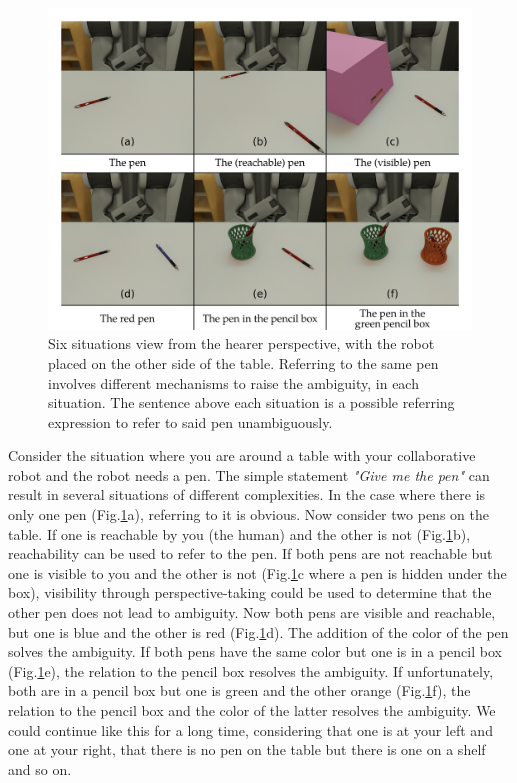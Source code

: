 \begin{figure}[h!]
\centering
\includegraphics[scale=0.16]{figures/chapter4/intro.png}
\caption{\label{fig:chap4_intro} Six situations view from the hearer perspective, with the robot placed on the other side of the table. Referring to the same pen involves different mechanisms to raise the ambiguity, in each situation. The sentence above each situation is a possible referring expression to refer to said pen unambiguously. }
\end{figure}

Consider the situation where you are around a table with your collaborative robot and the robot needs a pen. The simple statement \textit{"Give me the pen"} can result in several situations of different complexities. In the case where there is only one pen (Fig.\ref{fig:chap4_intro}a), referring to it is obvious. Now consider two pens on the table. If one is reachable by you (the human) and the other is not (Fig.\ref{fig:chap4_intro}b), reachability can be used to refer to the pen. If both pens are not reachable but one is visible to you and the other is not (Fig.\ref{fig:chap4_intro}c where a pen is hidden under the box), visibility through perspective-taking could be used to determine that the other pen does not lead to ambiguity. Now both pens are visible and reachable, but one is blue and the other is red (Fig.\ref{fig:chap4_intro}d). The addition of the color of the pen solves the ambiguity. If both pens have the same color but one is in a pencil box (Fig.\ref{fig:chap4_intro}e), the relation to the pencil box resolves the ambiguity. If unfortunately, both are in a pencil box but one is green and the other orange (Fig.\ref{fig:chap4_intro}f), the relation to the pencil box and the color of the latter resolves the ambiguity. We could continue like this for a long time, considering that one is at your left and one at your right, that there is no pen on the table but there is one on a shelf and so on.

